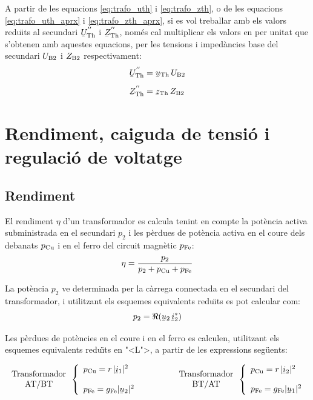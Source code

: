 A partir de les equacions \eqref{eq:trafo_uth} i
\eqref{eq:trafo_zth}, o de les equacions \eqref{eq:trafo_uth_aprx} i
\eqref{eq:trafo_zth_aprx}, si es vol treballar amb els valors
redu\"{\i}ts al secundari $\cmplx{U}\ped{Th}^{''}$ i
$\cmplx{Z}\ped{Th}^{''}$, nom\'{e}s cal multiplicar els valors en per unitat
que s'obtenen amb aquestes equacions, per les tensions i imped\`{a}ncies
base del secundari $U_\mathrm{B2}$ i $Z_\mathrm{B2}$ respectivament:
\begin{align}
    \cmplx{U}\ped{Th}^{''} &= \cmplx{u}\ped{Th} \, U\ped{B2} \\[1ex]
    \cmplx{Z}\ped{Th}^{''} &= \cmplx{z}\ped{Th} \, Z\ped{B2}
\end{align}


\section{Rendiment, caiguda de tensi\'{o} i regulaci\'{o} de voltatge}

\subsection{Rendiment}

El rendiment $\eta$ d'un transformador es calcula tenint en compte la pot\`{e}ncia activa subministrada en el secundari $p_2$ i les p\`{e}rdues de pot\`{e}ncia activa en el coure dels debanats $p_\mathrm{Cu}$ i en el ferro del circuit magn\`{e}tic $p_\mathrm{Fe}$:
\begin{equation}
    \eta = \frac{p_2}{p_2 + p_\mathrm{Cu} + p_\mathrm{Fe}}
\end{equation}

La pot\`{e}ncia $p_2$ ve determinada per la c\`{a}rrega connectada en el secundari del transformador, i utilitzant els esquemes equivalents redu\"{\i}ts es pot calcular com:
\begin{equation}
    p_2 = \Re(\cmplx{u}_2 \,\cmplx{i}_2^*)
\end{equation}

Les p\`{e}rdues de pot\`{e}ncies  en el coure i en el ferro es calculen, utilitzant els esquemes equivalents redu\"{\i}ts en {"<}L{">}, a partir de les expressions seg\"{u}ents:

\begin{equation}
\begin{array}{c}\text{Transformador}\\
\text{AT/BT}
\end{array} \left\{
\begin{array}{l}
   p\ped{Cu} = r \,|\cmplx{i}_1|^2 \\[2.7ex]
   p\ped{Fe} = g\ped{Fe} |\cmplx{u}_2|^2
\end{array}
\right. \qquad\qquad
\begin{array}{c}\text{Transformador}\\
\text{BT/AT}
\end{array} \left\{
\begin{array}{l}
   p\ped{Cu} = r \,|\cmplx{i}_2|^2 \\[2.5ex]
   p\ped{Fe} = g\ped{Fe} |\cmplx{u}_1|^2
\end{array}
\right.
\end{equation}

